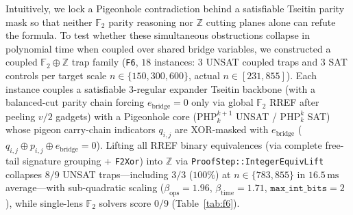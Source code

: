\documentclass[11pt]{article}
\begin{document}
Intuitively, we lock a Pigeonhole contradiction behind a satisfiable Tseitin parity mask so that neither $\mathbb{F}_2$ parity reasoning nor $\mathbb{Z}$ cutting planes alone can refute the formula. To test whether these simultaneous obstructions collapse in polynomial time when coupled over shared bridge variables, we constructed a coupled $\mathbb{F}_2 \oplus \mathbb{Z}$ trap family (\texttt{F6}, $18$ instances: $3$ UNSAT coupled traps and $3$ SAT controls per target scale $n \in \{150, 300, 600\}$, actual $n \in [231, 855]$). Each instance couples a satisfiable 3-regular expander Tseitin backbone (with a balanced-cut parity chain forcing $e_{\text{bridge}} = 0$ only via global $\mathbb{F}_2$ RREF after peeling $v/2$ gadgets) with a Pigeonhole core ($\mathrm{PHP}_k^{k+1}$ UNSAT / $\mathrm{PHP}_k^k$ SAT) whose pigeon carry-chain indicators $q_{i,j}$ are XOR-masked with $e_{\text{bridge}}$ ($q_{i,j} \oplus p_{i,j} \oplus e_{\text{bridge}} = 0$). Lifting all RREF binary equivalences (via complete free-tail signature grouping + \texttt{F2Xor}) into $\mathbb{Z}$ via \texttt{ProofStep::IntegerEquivLift} collapses $8/9$ UNSAT traps---including $3/3$ ($100\%$) at $n \in \{783, 855\}$ in $16.5\,\text{ms}$ average---with sub-quadratic scaling ($\beta_{\text{ops}} = 1.96$, $\beta_{\text{time}} = 1.71$, $\texttt{max\_int\_bits} = 2$), while single-lens $\mathbb{F}_2$ solvers score $0/9$ (Table~\ref{tab:f6}).

\begin{table}[t]
\centering
\caption{Coupled $\mathbb{F}_2 \oplus \mathbb{Z}$ boundary experiment (\texttt{F6}, $18$ instances, $n \in [231, 855]$).}
\label{tab:f6}
\end{table}
\end{document}
